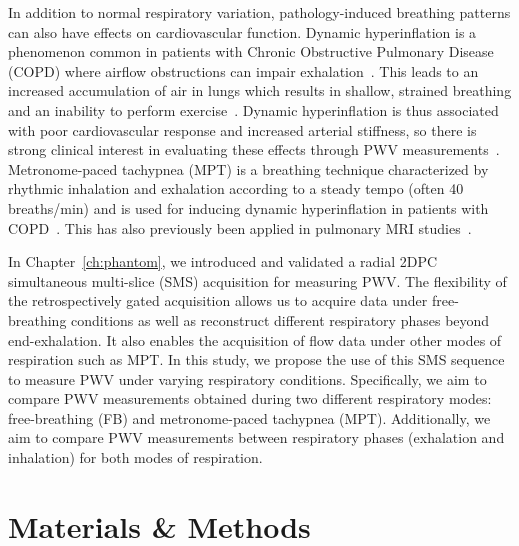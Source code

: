 In addition to normal respiratory variation, pathology-induced breathing patterns can also have effects on cardiovascular function. Dynamic hyperinflation is a phenomenon common in patients with Chronic Obstructive Pulmonary Disease (COPD) where airflow obstructions can impair exhalation~\cite{agustiDynamicHyperinflationPulmonary2007}. This leads to an increased accumulation of air in lungs which results in shallow, strained breathing and an inability to perform exercise~\cite{cooperDeterminantsDynamicHyperinflation2014}. Dynamic hyperinflation is thus associated with poor cardiovascular response and increased arterial stiffness, so there is strong clinical interest in evaluating these effects through PWV measurements~\cite{tzaniDynamicHyperinflationAssociated2011, galeAorticPulseWave2019, wernzFeasibilityRepeatabilityCorrelation2024}. Metronome-paced tachypnea (MPT) is a breathing technique characterized by rhythmic inhalation and exhalation according to a steady tempo (often 40 breaths/min) and is used for inducing dynamic hyperinflation in patients with COPD~\cite{cooperMetronomePacedTachypneaSimple2024}. This has also previously been applied in pulmonary MRI studies~\cite{mullerPhaseResolvedFunctionalLung2025}. 

In Chapter~\ref{ch:phantom}, we introduced and validated a radial 2DPC simultaneous multi-slice (SMS) acquisition for measuring PWV\@. The flexibility of the retrospectively gated acquisition allows us to acquire data under free-breathing conditions as well as reconstruct different respiratory phases beyond end-exhalation. It also enables the acquisition of flow data under other modes of respiration such as MPT\@. In this study, we propose the use of this SMS sequence to measure PWV under varying respiratory conditions. Specifically, we aim to compare PWV measurements obtained during two different respiratory modes: free-breathing (FB) and metronome-paced tachypnea (MPT). Additionally, we aim to compare PWV measurements between respiratory phases (exhalation and inhalation) for both modes of respiration.

\section{Materials \& Methods}\label{sec:sms_methods}
